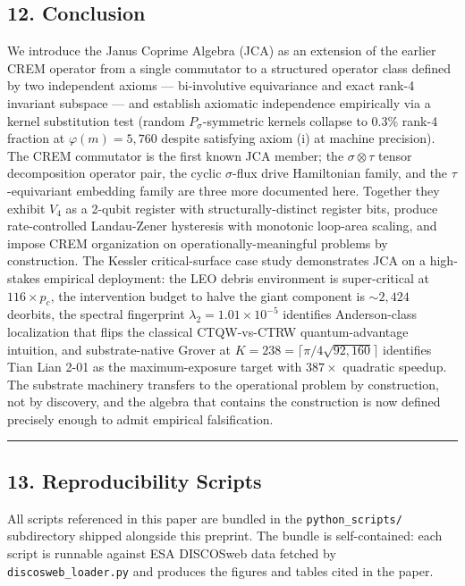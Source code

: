 \documentclass[
]{article}
\begin{document}
\subsection{12. Conclusion}\label{conclusion}

We introduce the Janus Coprime Algebra (JCA) as an extension of the
earlier CREM operator from a single commutator to a structured operator
class defined by two independent axioms --- bi-involutive equivariance
and exact rank-4 invariant subspace --- and establish axiomatic
independence empirically via a kernel substitution test (random
\(P_\sigma\)-symmetric kernels collapse to 0.3\% rank-4 fraction at
\(\varphi(m) = 5{,}760\) despite satisfying axiom (i) at machine
precision). The CREM commutator is the first known JCA member; the
\(\sigma\otimes\tau\) tensor decomposition operator pair, the cyclic
\(\sigma\)-flux drive Hamiltonian family, and the \(\tau\)-equivariant
embedding family are three more documented here. Together they exhibit
\(V_4\) as a 2-qubit register with structurally-distinct register bits,
produce rate-controlled Landau-Zener hysteresis with monotonic loop-area
scaling, and impose CREM organization on operationally-meaningful
problems by construction. The Kessler critical-surface case study
demonstrates JCA on a high-stakes empirical deployment: the LEO debris
environment is super-critical at \(116 \times p_c\), the intervention
budget to halve the giant component is \(\sim 2{,}424\) deorbits, the
spectral fingerprint \(\lambda_2 = 1.01 \times 10^{-5}\) identifies
Anderson-class localization that flips the classical CTQW-vs-CTRW
quantum-advantage intuition, and substrate-native Grover at
\(K = 238 = \lceil\pi/4 \sqrt{92{,}160}\rceil\) identifies Tian Lian
2-01 as the maximum-exposure target with \(387\times\) quadratic
speedup. The substrate machinery transfers to the operational problem by
construction, not by discovery, and the algebra that contains the
construction is now defined precisely enough to admit empirical
falsification.

\begin{center}\rule{0.5\linewidth}{0.5pt}\end{center}

\subsection{13. Reproducibility Scripts}\label{reproducibility-scripts}

All scripts referenced in this paper are bundled in the
\texttt{python\_scripts/} subdirectory shipped alongside this preprint.
The bundle is self-contained: each script is runnable against ESA
DISCOSweb data fetched by \texttt{discosweb\_loader.py} and produces the
figures and tables cited in the paper.
\end{document}
